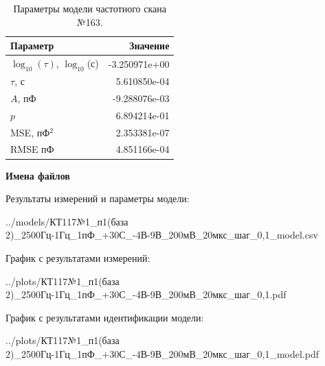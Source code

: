 \begin{table}[!ht]
    \centering
    \caption{Параметры модели частотного скана №163.}
    \begin{tabular}{|l|r|}
        \hline
        Параметр                                       & Значение                  \\ \hline
        $\log_{10}(\tau)$, $\log_{10}$(с)              & -3.250971e+00             \\ \hline
        $\tau$, с                                      & 5.610850e-04              \\ \hline
        $A$, пФ                                        & -9.288076e-03             \\ \hline
        $p$                                            & 6.894214e-01              \\ \hline
        MSE, пФ$^2$                                    & 2.353381e-07              \\ \hline
        RMSE пФ                                        & 4.851166e-04              \\ \hline
    \end{tabular}
    \label{table:frequency_scan_model_163}
\end{table}

\textbf{Имена файлов}

Результаты измерений и параметры модели:

\scriptsize../models/КТ117№1\_п1(база 2)\_2500Гц-1Гц\_1пФ\_+30С\_-4В-9В\_200мВ\_20мкс\_шаг\_0,1\_model.csv
\normalsize

График с результатами измерений:

\scriptsize../plots/КТ117№1\_п1(база 2)\_2500Гц-1Гц\_1пФ\_+30С\_-4В-9В\_200мВ\_20мкс\_шаг\_0,1.pdf
\normalsize

График с результатами идентификации модели:

\scriptsize../plots/КТ117№1\_п1(база 2)\_2500Гц-1Гц\_1пФ\_+30С\_-4В-9В\_200мВ\_20мкс\_шаг\_0,1\_model.pdf
\normalsize

